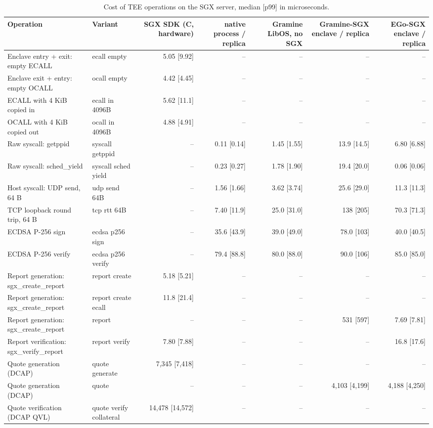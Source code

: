 \begin{table}[t]
\centering
\small
\caption{Cost of TEE operations on the SGX server, median [p99] in microseconds.}
\label{tab:teeops}
\begin{tabular}{llrrrrr}
\toprule
Operation & Variant & SGX SDK (C, hardware) & native process / replica & Gramine LibOS, no SGX & Gramine-SGX enclave / replica & EGo-SGX enclave / replica \\
\midrule
Enclave entry + exit: empty ECALL & ecall empty & 5.05 [9.92] & – & – & – & – \\
Enclave exit + entry: empty OCALL & ocall empty & 4.42 [4.45] & – & – & – & – \\
ECALL with 4 KiB copied in & ecall in 4096B & 5.62 [11.1] & – & – & – & – \\
OCALL with 4 KiB copied out & ocall in 4096B & 4.88 [4.91] & – & – & – & – \\
Raw syscall: getppid & syscall getppid & – & 0.11 [0.14] & 1.45 [1.55] & 13.9 [14.5] & 6.80 [6.88] \\
Raw syscall: sched\_yield & syscall sched yield & – & 0.23 [0.27] & 1.78 [1.90] & 19.4 [20.0] & 0.06 [0.06] \\
Host syscall: UDP send, 64 B & udp send 64B & – & 1.56 [1.66] & 3.62 [3.74] & 25.6 [29.0] & 11.3 [11.3] \\
TCP loopback round trip, 64 B & tcp rtt 64B & – & 7.40 [11.9] & 25.0 [31.0] & 138 [205] & 70.3 [71.3] \\
ECDSA P-256 sign & ecdsa p256 sign & – & 35.6 [43.9] & 39.0 [49.0] & 78.0 [103] & 40.0 [40.5] \\
ECDSA P-256 verify & ecdsa p256 verify & – & 79.4 [88.8] & 80.0 [88.0] & 90.0 [106] & 85.0 [85.0] \\
Report generation: sgx\_create\_report & report create & 5.18 [5.21] & – & – & – & – \\
Report generation: sgx\_create\_report & report create ecall & 11.8 [21.4] & – & – & – & – \\
Report generation: sgx\_create\_report & report & – & – & – & 531 [597] & 7.69 [7.81] \\
Report verification: sgx\_verify\_report & report verify & 7.80 [7.88] & – & – & – & 16.8 [17.6] \\
Quote generation (DCAP) & quote generate & 7,345 [7,418] & – & – & – & – \\
Quote generation (DCAP) & quote & – & – & – & 4,103 [4,199] & 4,188 [4,250] \\
Quote verification (DCAP QVL) & quote verify collateral & 14,478 [14,572] & – & – & – & – \\

\end{tabular}
\end{table}
